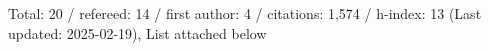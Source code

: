 Total: 20 / refereed: 14 / first author: 4 / citations: 1,574 / h-index: 13 (Last updated: 2025-02-19), List attached below